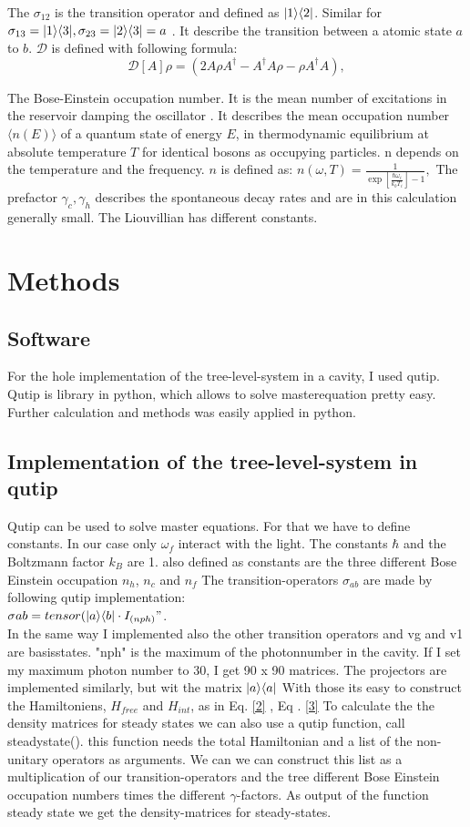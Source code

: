 \documentclass[12pt,a4paper]{article}
\DeclarePairedDelimiter\bra{\langle}{\rvert}
\DeclarePairedDelimiter\ket{\lvert}{\rangle}
\begin{document}
The $\sigma_{12} $ is the transition operator and defined as $ \ket{1}\bra{2}$. Similar for $\sigma_{13}=\ket{1}\bra{3}, \sigma_{23}=\ket{2}\bra{3}=a$ . It describe the transition between a atomic state $a$ to $b$.
$\mathcal{D}$ is defined with following formula:
\begin{equation}
\mathcal{D}[A]\rho=(2A \rho	A^{\dag}-A^{\dag}A\rho-\rho A^{\dag}A),
\end{equation}

The Bose-Einstein occupation number. It is the mean number of excitations in the reservoir damping the oscillator  . It describes the mean occupation number $\langle n(E) \rangle$ of a quantum state of energy $E$, in thermodynamic equilibrium at absolute temperature $T $ for identical bosons as occupying particles. n depends on the temperature and the frequency.
$n$ is defined as:
$
n(\omega,T)=\frac{1}{\exp[\frac{\hbar \omega_i}{k_b T_i}]-1},
$
The  prefactor $\gamma_c ,\gamma_h$ describes the spontaneous decay rates and are in this calculation generally small.
The Liouvillian has different constants. 
\section{Methods}
\subsection{Software}
For the hole implementation of the tree-level-system in a cavity, I used qutip. Qutip is library in python, which allows to solve masterequation pretty easy.
Further calculation and methods was easily applied in python. 
\subsection{Implementation of the tree-level-system in qutip}
Qutip can be used to solve master equations. For that we have to define constants.  
In our case only $\omega_f$ interact with the light. 
The constants $\hbar $ and the Boltzmann factor $k_B$ are 1.
also defined as constants are the three different Bose Einstein occupation $n_h$, $n_c$ and $n_f$
The transition-operators $\sigma_{ab}$ are  made by following qutip implementation:\\ $\sigma_{}ab=tensor(\ket{a}\bra{b}\cdot I_{(nph)}"$.\\
In the same way I implemented also the other transition operators and 
vg and v1 are basisstates.  "nph" is the maximum of the photonnumber in the cavity. If I set my maximum photon number to 30, I get 90 x 90 matrices. 
The projectors are implemented similarly, but wit the matrix $\ket{a}\bra{a}$
With those its easy to construct the Hamiltoniens, $H_{free}$ and $H_{int}$, as in Eq. \eqref{2} , Eq . \eqref{3} 
To calculate the the density matrices for steady states we can also use a qutip function, call steadystate().
this function needs the total Hamiltonian and a list of the non-unitary operators as arguments.
We can we can construct this list as a multiplication of our transition-operators and the tree different Bose Einstein occupation numbers times the different $\gamma$-factors. 
As output of the function steady state we get the density-matrices for steady-states. \cite{Nation2022}
\end{document}
